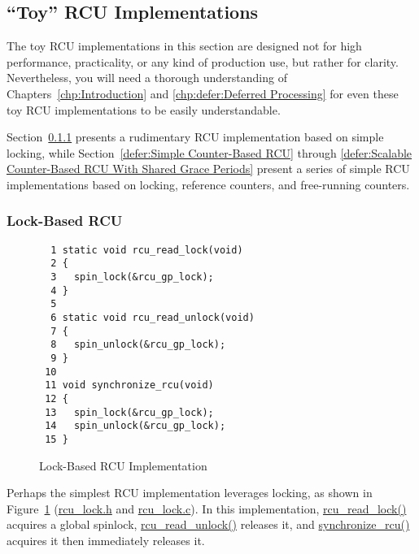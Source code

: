 
\subsection{``Toy'' RCU Implementations}
\label{defer:``Toy'' RCU Implementations}

The toy RCU implementations in this section are designed not for
high performance, practicality, or any kind of production use,
but rather for clarity.
Nevertheless, you will need a thorough understanding of
Chapters~\ref{chp:Introduction} and
\ref{chp:defer:Deferred Processing}
for even these toy RCU implementations to be easily understandable.

Section~\ref{defer:Lock-Based RCU} presents a rudimentary
RCU implementation based on simple locking, while
Section~\ref{defer:Simple Counter-Based RCU} through
\ref{defer:Scalable Counter-Based RCU With Shared Grace Periods}
present a series of
simple RCU implementations based on locking, reference counters,
and free-running counters.

\subsubsection{Lock-Based RCU}
\label{defer:Lock-Based RCU}

\begin{figure}[bp]
{ \scriptsize
\begin{verbatim}
  1 static void rcu_read_lock(void)
  2 {
  3   spin_lock(&rcu_gp_lock);
  4 }
  5 
  6 static void rcu_read_unlock(void)
  7 {
  8   spin_unlock(&rcu_gp_lock);
  9 }
 10 
 11 void synchronize_rcu(void)
 12 {
 13   spin_lock(&rcu_gp_lock);
 14   spin_unlock(&rcu_gp_lock);
 15 }
\end{verbatim}
}
\caption{Lock-Based RCU Implementation}
\label{fig:defer:Lock-Based RCU Implementation}
\end{figure}

Perhaps the simplest RCU implementation leverages locking, as
shown in
Figure~\ref{fig:defer:Lock-Based RCU Implementation}
(\url{rcu_lock.h} and \url{rcu_lock.c}).
In this implementation, \url{rcu_read_lock()} acquires a global
spinlock, \url{rcu_read_unlock()} releases it, and
\url{synchronize_rcu()} acquires it then immediately releases it.

